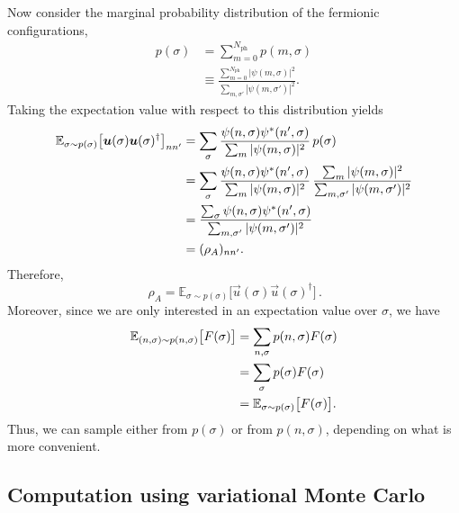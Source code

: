 \documentclass[../../main.tex]{subfiles}
\begin{document}
Now consider the marginal probability distribution of the fermionic
configurations,
\begin{align}
p(\sigma) &=
\sum_{m=0}^{N_{\mathrm{ph}}} p(m, \sigma) \\
&\equiv \frac{\sum_{m=0}^{N_{\mathrm{ph}}}|\psi(m,\sigma)|^2}
{\sum_{m,\sigma'}|\psi(m,\sigma')|^2} .
\end{align}
Taking the expectation value with respect to this distribution yields
\begin{align}
\mathbb E_{\sigma\sim p(\sigma)}
\bigl[\vec u(\sigma)\vec u(\sigma)^\dagger\bigr]_{nn'}
&=\sum_\sigma
  \frac{\psi(n,\sigma)\psi^*(n',\sigma)}
       {\sum_m|\psi(m,\sigma)|^2}\,p(\sigma)\notag\\
&=\sum_\sigma
  \frac{\psi(n,\sigma)\psi^*(n',\sigma)}
       {\sum_m|\psi(m,\sigma)|^2}\,
  \frac{\sum_m|\psi(m,\sigma)|^2}
       {\sum_{m,\sigma'}|\psi(m,\sigma')|^2}\notag\\
&=\frac{\sum_\sigma\psi(n,\sigma)\psi^*(n',\sigma)}
       {\sum_{m,\sigma'}|\psi(m,\sigma')|^2}\notag\\
&=(\rho_A)_{nn'}.
\end{align}
Therefore,
\begin{equation}
\boxed{\,
\rho_A=
\mathbb E_{\sigma\sim p(\sigma)}
\bigl[\vec u(\sigma)\vec u(\sigma)^\dagger\bigr]
\,}.
\end{equation}
Moreover, since we are only interested in an expectation value over $\sigma$, we have
\begin{align}
\mathbb E_{(n,\sigma)\sim p(n, \sigma)}
\bigl[F(\sigma)\bigr]
&=\sum_{n,\sigma}
  p(n, \sigma) F(\sigma) \notag\\
&=\sum_{\sigma}
  p(\sigma) F(\sigma) \notag\\
&= \mathbb E_{\sigma\sim p(\sigma)}
\bigl[F(\sigma)\bigr] . \label{eq:expectation_value_equal_probability_marginal_probability}
\end{align}
Thus, we can sample either from $p(\sigma)$ or from $p(n,\sigma)$, depending on what is more convenient.

\subsection{Computation using variational Monte Carlo}
\end{document}
